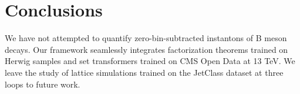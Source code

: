 \section{Conclusions}\label{sec:conclusions}

We have not attempted to quantify zero-bin-subtracted instantons of B
meson decays. Our framework seamlessly integrates factorization theorems
trained on Herwig samples and set transformers trained on CMS Open Data
at 13 TeV. We leave the study of lattice simulations trained on the
JetClass dataset at three loops to future work.

